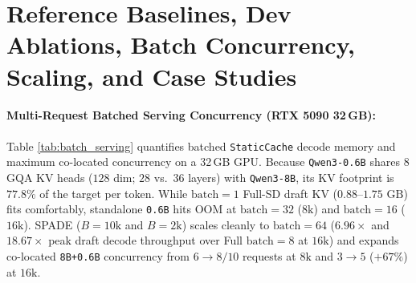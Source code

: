 \documentclass[11pt]{article}
\begin{document}
\begin{table}[ht]
\centering
\small
{}
\caption{\textbf{Empirical Audit of Evidence Logit Biasing ($N = 9,331$ prefixes):} Evaluating static logit biasing across 100 claims under teacher-forced verification. Biasing provides practically negligible gains at small weights ($\le +0.11\text{ pp}$), displays an inconclusive downward trend at $\beta_0 = 1.50$, and incurs statistically significant degradation at $\beta_0 = 2.00$ ($p = 0.0042$), while adding latency overhead.}
\label{tab:direction_a_polarity}
\end{table}

\section{Reference Baselines, Dev Ablations, Batch Concurrency, Scaling, and Case Studies}
\label{app:reference_baselines}





\paragraph{Multi-Request Batched Serving Concurrency (RTX 5090 32\,GB):}
Table \ref{tab:batch_serving} quantifies batched \texttt{StaticCache} decode memory and maximum co-located concurrency on a 32\,GB GPU. Because \texttt{Qwen3-0.6B} shares $8$ GQA KV heads ($128$ dim; $28$ vs.\ $36$ layers) with \texttt{Qwen3-8B}, its KV footprint is $77.8\%$ of the target per token. While $\text{batch}=1$ Full-SD draft KV ($0.88$--$1.75\text{ GB}$) fits comfortably, standalone \texttt{0.6B} hits OOM at $\text{batch}=32$ ($8\text{k}$) and $\text{batch}=16$ ($16\text{k}$). SPADE ($B=10\text{k}$ and $B=2\text{k}$) scales cleanly to $\text{batch}=64$ ($6.96\times$ and $18.67\times$ peak draft decode throughput over Full $\text{batch}=8$ at $16\text{k}$) and expands co-located \texttt{8B+0.6B} concurrency from $6 \to 8 / 10$ requests at $8\text{k}$ and $3 \to 5$ ($+67\%$) at $16\text{k}$.
\end{document}
